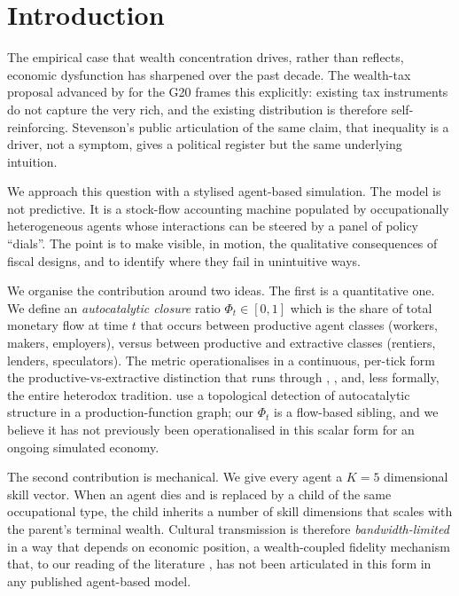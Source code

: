 \documentclass[11pt]{article}
\begin{document}
\section{Introduction}

The empirical case that wealth concentration drives, rather than reflects,
economic dysfunction has sharpened over the past decade. The wealth-tax
proposal advanced by \citet{zucman2024global} for the G20 frames this
explicitly: existing tax instruments do not capture the very rich, and
the existing distribution is therefore self-reinforcing. Stevenson's
public articulation of the same claim, that inequality is a driver,
not a symptom, gives a political register but the same underlying
intuition.

We approach this question with a stylised agent-based simulation. The
model is not predictive. It is a stock-flow accounting machine populated
by occupationally heterogeneous agents whose interactions can be steered
by a panel of policy ``dials''. The point is to make visible, in motion,
the qualitative consequences of fiscal designs, and to identify where
they fail in unintuitive ways.

We organise the contribution around two ideas. The first is a
quantitative one. We define an \emph{autocatalytic closure} ratio
$\Phi_t \in [0,1]$ which is the share of total monetary flow at time $t$
that occurs between productive agent classes (workers, makers,
employers), versus between productive and extractive classes (rentiers,
lenders, speculators). The metric operationalises in a continuous,
per-tick form the productive-vs-extractive distinction that runs through
\citet{kauffman1988evolution}, \citet{mazzucato2018value}, and, less
formally, the entire heterodox tradition.
\citet{hordijk2023emergence} use a topological detection of autocatalytic
structure in a production-function graph; our $\Phi_t$ is a flow-based
sibling, and we believe it has not previously been operationalised in
this scalar form for an ongoing simulated economy.

The second contribution is mechanical. We give every agent a $K=5$
dimensional skill vector. When an agent dies and is replaced by a
child of the same occupational type, the child inherits a number of
skill dimensions that scales with the parent's terminal wealth. Cultural
transmission is therefore \emph{bandwidth-limited} in a way that depends
on economic position, a wealth-coupled fidelity mechanism that, to
our reading of the literature \citep{cavallisforza1981cultural,
henrich2004demography, lewis2012transmission, henrich2001evolution}, has
not been articulated in this form in any published agent-based model.
\end{document}
